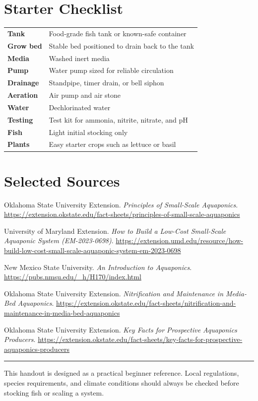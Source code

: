 \documentclass[11pt]{article}
\begin{document}
\section*{Starter Checklist}
\begin{tabularx}{\linewidth}{>{\bfseries}l X}
Tank & Food-grade fish tank or known-safe container \\
Grow bed & Stable bed positioned to drain back to the tank \\
Media & Washed inert media \\
Pump & Water pump sized for reliable circulation \\
Drainage & Standpipe, timer drain, or bell siphon \\
Aeration & Air pump and air stone \\
Water & Dechlorinated water \\
Testing & Test kit for ammonia, nitrite, nitrate, and pH \\
Fish & Light initial stocking only \\
Plants & Easy starter crops such as lettuce or basil \\
\end{tabularx}

\section*{Selected Sources}
\begin{enumerate}[label={[\arabic*]}]
  \raggedright
  \item Oklahoma State University Extension. \emph{Principles of Small-Scale Aquaponics}. \url{https://extension.okstate.edu/fact-sheets/principles-of-small-scale-aquaponics}
  \item University of Maryland Extension. \emph{How to Build a Low-Cost Small-Scale Aquaponic System (EM-2023-0698)}. \url{https://extension.umd.edu/resource/how-build-low-cost-small-scale-aquaponic-system-em-2023-0698}
  \item New Mexico State University. \emph{An Introduction to Aquaponics}. \url{https://pubs.nmsu.edu/_h/H170/index.html}
  \item Oklahoma State University Extension. \emph{Nitrification and Maintenance in Media-Bed Aquaponics}. \url{https://extension.okstate.edu/fact-sheets/nitrification-and-maintenance-in-media-bed-aquaponics}
  \item Oklahoma State University Extension. \emph{Key Facts for Prospective Aquaponics Producers}. \url{https://extension.okstate.edu/fact-sheets/key-facts-for-prospective-aquaponics-producers}
\end{enumerate}

\vfill
\hrule
\smallskip
{\footnotesize This handout is designed as a practical beginner reference. Local regulations, species requirements, and climate conditions should always be checked before stocking fish or scaling a system.}
\end{document}
